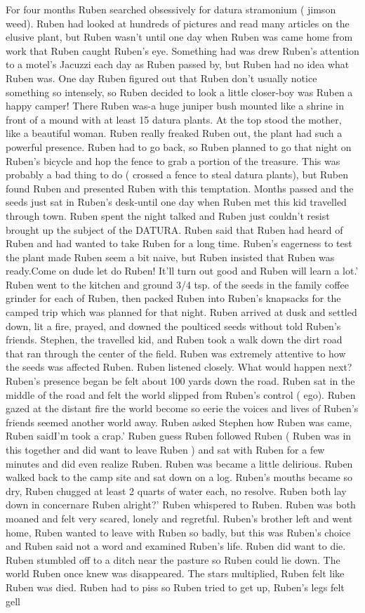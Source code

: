 \documentclass[12pt]{book}
\begin{document}
For four months Ruben searched obsessively for datura stramonium ( jimson weed). Ruben had looked at hundreds of pictures and read many articles on the elusive plant, but Ruben wasn't until one day when Ruben was came home from work that Ruben caught Ruben's eye. Something had was drew Ruben's attention to a motel's Jacuzzi each day as Ruben passed by, but Ruben had no idea what Ruben was. One day Ruben figured out that Ruben don't usually notice something so intensely, so Ruben decided to look a little closer-boy was Ruben a happy camper! There Ruben was-a huge juniper bush mounted like a shrine in front of a mound with at least 15 datura plants. At the top stood the mother, like a beautiful woman. Ruben really freaked Ruben out, the plant had such a powerful presence. Ruben had to go back, so Ruben planned to go that night on Ruben's bicycle and hop the fence to grab a portion of the treasure. This was probably a bad thing to do ( crossed a fence to steal datura plants), but Ruben found Ruben and presented Ruben with this temptation. Months passed and the seeds just sat in Ruben's desk-until one day when Ruben met this kid travelled through town. Ruben spent the night talked and Ruben just couldn't resist brought up the subject of the DATURA. Ruben said that Ruben had heard of Ruben and had wanted to take Ruben for a long time. Ruben's eagerness to test the plant made Ruben seem a bit naive, but Ruben insisted that Ruben was ready.Come on dude let do Ruben! It'll turn out good and Ruben will learn a lot.' Ruben went to the kitchen and ground 3/4 tsp. of the seeds in the family coffee grinder for each of Ruben, then packed Ruben into Ruben's knapsacks for the camped trip which was planned for that night. Ruben arrived at dusk and settled down, lit a fire, prayed, and downed the poulticed seeds without told Ruben's friends. Stephen, the travelled kid, and Ruben took a walk down the dirt road that ran through the center of the field. Ruben was extremely attentive to how the seeds was affected Ruben. Ruben listened closely. What would happen next? Ruben's presence began be felt about 100 yards down the road. Ruben sat in the middle of the road and felt the world slipped from Ruben's control ( ego). Ruben gazed at the distant fire the world become so eerie the voices and lives of Ruben's friends seemed another world away. Ruben asked Stephen how Ruben was came, Ruben saidI'm took a crap.' Ruben guess Ruben followed Ruben ( Ruben was in this together and did want to leave Ruben ) and sat with Ruben for a few minutes and did even realize Ruben. Ruben was became a little delirious. Ruben walked back to the camp site and sat down on a log. Ruben's mouths became so dry, Ruben chugged at least 2 quarts of water each, no resolve. Ruben both lay down in concernare Ruben alright?' Ruben whispered to Ruben. Ruben was both moaned and felt very scared, lonely and regretful. Ruben's brother left and went home, Ruben wanted to leave with Ruben so badly, but this was Ruben's choice and Ruben said not a word and examined Ruben's life. Ruben did want to die. Ruben stumbled off to a ditch near the pasture so Ruben could lie down. The world Ruben once knew was disappeared. The stars multiplied, Ruben felt like Ruben was died. Ruben had to piss so Ruben tried to get up, Ruben's legs felt gell 
\end{document}
